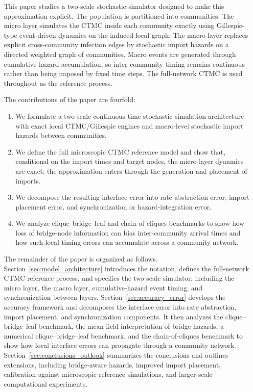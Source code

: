 \documentclass[12pt,a4paper]{article}
\begin{document}
This paper studies a two-scale stochastic simulator designed to make this approximation explicit. The population is partitioned into communities. The micro layer simulates the CTMC inside each community exactly using Gillespie-type event-driven dynamics on the induced local graph. The macro layer replaces explicit cross-community infection edges by stochastic import hazards on a directed weighted graph of communities. Macro events are generated through cumulative hazard accumulation, so inter-community timing remains continuous rather than being imposed by fixed time steps. The full-network CTMC is used throughout as the reference process.

The contributions of the paper are fourfold:
\begin{enumerate}
\item We formulate a two-scale continuous-time stochastic simulation architecture with exact local CTMC/Gillespie engines and macro-level stochastic import hazards between communities.
\item We define the full microscopic CTMC reference model and show that, conditional on the import times and target nodes, the micro-layer dynamics are exact; the approximation enters through the generation and placement of imports.
\item We decompose the resulting interface error into rate abstraction error, import placement error, and synchronization or hazard-integration error.
\item We analyze clique--bridge--leaf and chain-of-cliques benchmarks to show how loss of bridge-node information can bias inter-community arrival times and how such local timing errors can accumulate across a community network.
\end{enumerate}

The remainder of the paper is organized as follows. Section~\ref{sec:model_architecture} introduces the notation, defines the full-network CTMC reference process, and specifies the two-scale simulator, including the micro layer, the macro layer, cumulative-hazard event timing, and synchronization between layers. Section~\ref{sec:accuracy_error} develops the accuracy framework and decomposes the interface error into rate abstraction, import placement, and synchronization components. It then analyzes the clique--bridge--leaf benchmark, the mean-field interpretation of bridge hazards, a numerical clique--bridge--leaf benchmark, and the chain-of-cliques benchmark to show how local interface errors can propagate through a community network. Section~\ref{sec:conclusions_outlook} summarizes the conclusions and outlines extensions, including bridge-aware hazards, improved import placement, calibration against microscopic reference simulations, and larger-scale computational experiments.
\end{document}
